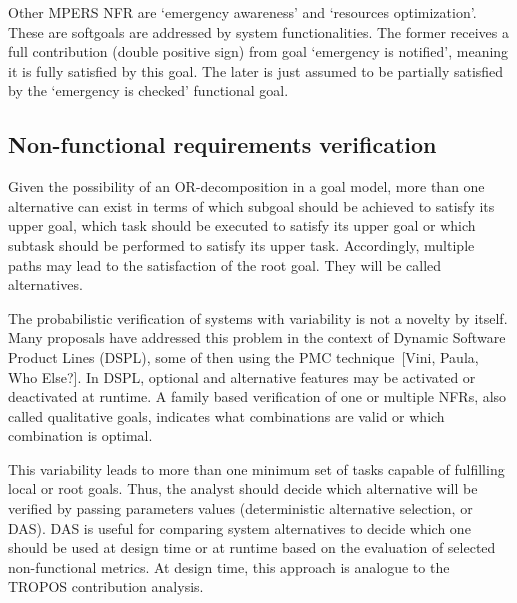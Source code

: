 
Other MPERS NFR are `emergency awareness' and `resources optimization'. These are softgoals are addressed by system functionalities. The former receives a full contribution (double positive sign) from goal `emergency is notified', meaning it is fully satisfied by this goal. The later is just assumed to be partially satisfied by the `emergency is checked' functional goal.

\subsection{Non-functional requirements verification}

Given the possibility of an OR-decomposition in a goal model, more than one alternative can exist in terms of which subgoal should be achieved to satisfy its upper goal, which task should be executed to satisfy its upper goal or which subtask should be performed to satisfy its upper task. Accordingly, multiple paths may lead to the satisfaction of the root goal. They will be called alternatives.

The probabilistic verification of systems with variability is not a novelty by itself. Many proposals have addressed this problem in the context of Dynamic Software Product Lines (DSPL), some of then using the PMC technique~[Vini, Paula, Who Else?]. In DSPL, optional and alternative features may be activated or deactivated at runtime. A family based verification of one or multiple NFRs, also called qualitative goals, indicates what combinations are valid or which combination is optimal.

This variability leads to more than one minimum set of tasks capable of fulfilling local or root goals. Thus, the analyst should decide which alternative will be verified by passing parameters values (deterministic alternative selection, or DAS). DAS is useful for comparing system alternatives to decide which one should be used at design time or at runtime based on the evaluation of selected non-functional metrics. At design time, this approach is analogue to the TROPOS contribution analysis. 



